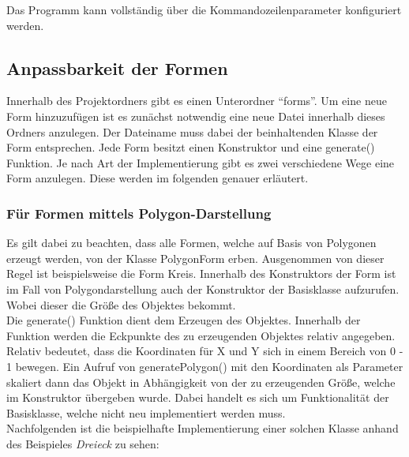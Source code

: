 Das Programm kann vollständig über die Kommandozeilenparameter konfiguriert werden. 

\newpage

\subsection{Anpassbarkeit der Formen}

Innerhalb des Projektordners gibt es einen Unterordner "`forms"'. Um eine neue Form hinzuzufügen ist es zunächst notwendig eine neue Datei innerhalb dieses Ordners anzulegen. Der Dateiname muss dabei der beinhaltenden Klasse der Form entsprechen. Jede Form besitzt einen Konstruktor und eine generate() Funktion. Je nach Art der Implementierung gibt es zwei verschiedene Wege eine Form anzulegen. Diese werden im folgenden genauer erläutert. \\


\subsubsection{Für Formen mittels Polygon-Darstellung}

Es gilt dabei zu beachten, dass alle Formen, welche auf Basis von Polygonen erzeugt werden, von der Klasse PolygonForm erben. Ausgenommen von dieser Regel ist beispielsweise die Form Kreis. Innerhalb des Konstruktors der Form ist im Fall von Polygondarstellung auch der Konstruktor der Basisklasse aufzurufen. Wobei dieser die Größe des Objektes bekommt.\\

Die generate() Funktion dient dem Erzeugen des Objektes. Innerhalb der Funktion werden die Eckpunkte des zu erzeugenden Objektes relativ angegeben. Relativ bedeutet, dass die Koordinaten für X und Y sich in einem Bereich von 0 - 1 bewegen. Ein Aufruf von generatePolygon() mit den Koordinaten als Parameter skaliert dann das Objekt in Abhängigkeit von der zu erzeugenden Größe, welche im Konstruktor übergeben wurde. Dabei handelt es sich um Funktionalität der Basisklasse, welche nicht neu implementiert werden muss. \\

Nachfolgenden ist die beispielhafte Implementierung einer solchen Klasse anhand des Beispieles \textit{Dreieck} zu sehen:\\

